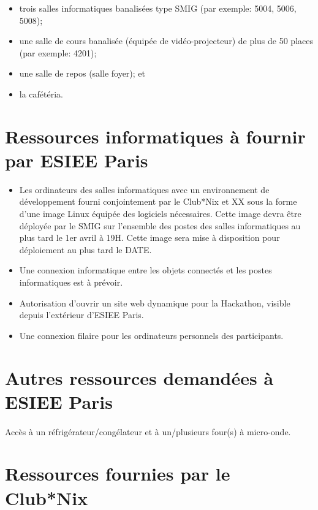 \documentclass{article}
\begin{document}
\begin{itemize}
  \item trois salles informatiques banalisées type SMIG (par exemple: 5004,
	  5006, 5008);
  \item une salle de cours banalisée (équipée de vidéo-projecteur) de plus de
	  50 places (par exemple: 4201);
  \item une salle de repos (salle foyer); et
  \item la cafétéria.
\end{itemize}

\section{Ressources informatiques à fournir par ESIEE Paris}

\begin{itemize}
	\item Les ordinateurs des salles informatiques avec un environnement de
		développement fourni conjointement par le Club*Nix et XX sous la forme
		d'une image Linux équipée des logiciels nécessaires. Cette image devra
		être déployée par le SMIG sur l'ensemble des postes des salles
		informatiques au plus tard le 1er avril à 19H. Cette image sera mise à
		disposition pour déploiement au plus tard le DATE.
	\item Une connexion informatique entre les objets connectés et les postes
		informatiques est à prévoir.
	\item Autorisation d'ouvrir un site web dynamique pour la Hackathon,
		visible depuis l'extérieur d'ESIEE Paris.
	\item Une connexion filaire pour les ordinateurs personnels des
		participants.
\end{itemize}

\section{Autres ressources demandées à ESIEE Paris}

\paragraph{}
Accès à un réfrigérateur/congélateur et à un/plusieurs four(s) à micro-onde.

\section{Ressources fournies par le Club*Nix}
\end{document}
